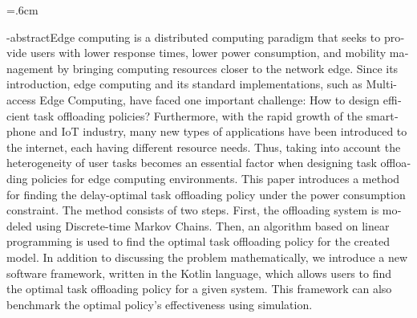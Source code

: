 
\baselineskip=.6cm
\begin{latin}
\en-abstract{Edge computing is a distributed computing paradigm that seeks to provide users with lower response times, lower power consumption, and mobility management by bringing computing resources closer to the network edge. Since its introduction, edge computing and its standard implementations, such as Multi-access Edge Computing, have faced one important challenge: How to design efficient task offloading policies? Furthermore, with the rapid growth of the smartphone and IoT industry, many new types of applications have been introduced to the internet, each having different resource needs. Thus, taking into account the heterogeneity of user tasks becomes an essential factor when designing task offloading policies for edge computing environments. This paper introduces a method for finding the delay-optimal task offloading policy under the power consumption constraint. The method consists of two steps. First, the offloading system is modeled using Discrete-time Markov Chains. Then, an algorithm based on linear programming is used to find the optimal task offloading policy for the created model. In addition to discussing the problem mathematically, we introduce a new software framework, written in the Kotlin language, which allows users to find the optimal task offloading policy for a given system. This framework can also benchmark the optimal policy's effectiveness using simulation.
}
\latinfirstPage
\end{latin}
